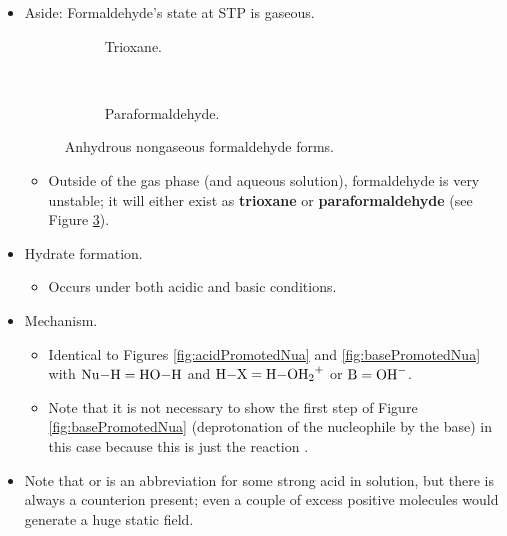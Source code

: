 \documentclass[../notes.tex]{subfiles}
\begin{document}
\begin{itemize}
\begin{itemize}
\begin{itemize}
        \end{itemize}
    \end{itemize}
    \item Aside: Formaldehyde's state at STP is gaseous.
    \begin{figure}[H]
        \centering
        \footnotesize
        \begin{subfigure}[b]{\linewidth}
            \centering
            \caption{Trioxane.}
            \label{fig:formaldehydeFormsa}
        \end{subfigure}\\
        \begin{subfigure}[b]{\linewidth}
            \centering
            \caption{Paraformaldehyde.}
            \label{fig:formaldehydeFormsb}
        \end{subfigure}
        \caption{Anhydrous nongaseous formaldehyde forms.}
        \label{fig:formaldehydeForms}
    \end{figure}
    \begin{itemize}
        \item Outside of the gas phase (and aqueous solution), formaldehyde is very unstable; it will either exist as \textbf{trioxane} or \textbf{paraformaldehyde} (see Figure \ref{fig:formaldehydeForms}).
    \end{itemize}
    \item Hydrate formation.
    \begin{itemize}
        \item Occurs under both acidic and basic conditions.
    \end{itemize}
    \item Mechanism.
    \begin{itemize}
        \item Identical to Figures \ref{fig:acidPromotedNua} and \ref{fig:basePromotedNua} with $\ce{Nu-H}=\ce{HO-H}$ and $\ce{H-X}=\ce{H-OH2+}$ or $\ce{B}=\ce{OH-}$.
        \item Note that it is not necessary to show the first step of Figure \ref{fig:basePromotedNua} (deprotonation of the nucleophile by the base) in this case because this is just the reaction .
    \end{itemize}
    \item Note that  or  is an abbreviation for some strong acid in solution, but there is always a counterion present; even a couple of excess positive molecules would generate a huge static field.

\end{itemize}
\end{document}
